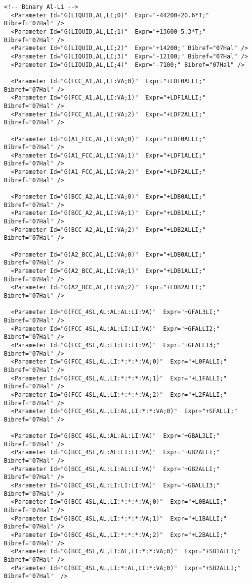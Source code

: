 \documentclass{article}
\begin{document}
\begin{appendices}
\begin{verbatim}
<!-- Binary Al-Li -->
  <Parameter Id="G(LIQUID,AL,LI;0)"  Expr="-44200+20.6*T;" Bibref="07Hal" />
  <Parameter Id="G(LIQUID,AL,LI;1)"  Expr="+13600-5.3*T;" Bibref="07Hal" />
  <Parameter Id="G(LIQUID,AL,LI;2)"  Expr="+14200;" Bibref="07Hal" />
  <Parameter Id="G(LIQUID,AL,LI;3)"  Expr="-12100;" Bibref="07Hal" />
  <Parameter Id="G(LIQUID,AL,LI;4)"  Expr="-7100;" Bibref="07Hal" />

  <Parameter Id="G(FCC_A1,AL,LI:VA;0)"  Expr="+LDF0ALLI;" Bibref="07Hal" />
  <Parameter Id="G(FCC_A1,AL,LI:VA;1)"  Expr="+LDF1ALLI;" Bibref="07Hal" />
  <Parameter Id="G(FCC_A1,AL,LI:VA;2)"  Expr="+LDF2ALLI;" Bibref="07Hal" />

  <Parameter Id="G(A1_FCC,AL,LI:VA;0)"  Expr="+LDF0ALLI;" Bibref="07Hal" />
  <Parameter Id="G(A1_FCC,AL,LI:VA;1)"  Expr="+LDF1ALLI;" Bibref="07Hal" />
  <Parameter Id="G(A1_FCC,AL,LI:VA;2)"  Expr="+LDF2ALLI;" Bibref="07Hal" />

  <Parameter Id="G(BCC_A2,AL,LI:VA;0)"  Expr="+LDB0ALLI;" Bibref="07Hal" />
  <Parameter Id="G(BCC_A2,AL,LI:VA;1)"  Expr="+LDB1ALLI;" Bibref="07Hal" />
  <Parameter Id="G(BCC_A2,AL,LI:VA;2)"  Expr="+LDB2ALLI;" Bibref="07Hal" />

  <Parameter Id="G(A2_BCC,AL,LI:VA;0)"  Expr="+LDB0ALLI;" Bibref="07Hal" />
  <Parameter Id="G(A2_BCC,AL,LI:VA;1)"  Expr="+LDB1ALLI;" Bibref="07Hal" />
  <Parameter Id="G(A2_BCC,AL,LI:VA;2)"  Expr="+LDB2ALLI;" Bibref="07Hal" />

  <Parameter Id="G(FCC_4SL,AL:AL:AL:LI:VA)"  Expr="+GFAL3LI;" Bibref="07Hal" />
  <Parameter Id="G(FCC_4SL,AL:AL:LI:LI:VA)"  Expr="+GFALLI2;" Bibref="07Hal" />
  <Parameter Id="G(FCC_4SL,AL:LI:LI:LI:VA)"  Expr="+GFALLI3;" Bibref="07Hal" />
  <Parameter Id="G(FCC_4SL,AL,LI:*:*:*:VA;0)"  Expr="+L0FALLI;" Bibref="07Hal" />
  <Parameter Id="G(FCC_4SL,AL,LI:*:*:*:VA;1)"  Expr="+L1FALLI;" Bibref="07Hal" />
  <Parameter Id="G(FCC_4SL,AL,LI:*:*:*:VA;2)"  Expr="+L2FALLI;" Bibref="07Hal" />
  <Parameter Id="G(FCC_4SL,AL,LI:AL,LI:*:*:VA;0)"  Expr="+SFALLI;" Bibref="07Hal" />

  <Parameter Id="G(BCC_4SL,AL:AL:AL:LI:VA)"  Expr="+GBAL3LI;" Bibref="07Hal" />
  <Parameter Id="G(BCC_4SL,AL:AL:LI:LI:VA)"  Expr="+GB2ALLI;" Bibref="07Hal" />
  <Parameter Id="G(BCC_4SL,AL:LI:AL:LI:VA)"  Expr="+GB2ALLI;" Bibref="07Hal" />
  <Parameter Id="G(BCC_4SL,AL:LI:LI:LI:VA)"  Expr="+GBALLI3;" Bibref="07Hal" />
  <Parameter Id="G(BCC_4SL,AL,LI:*:*:*:VA;0)"  Expr="+L0BALLI;" Bibref="07Hal" />
  <Parameter Id="G(BCC_4SL,AL,LI:*:*:*:VA;1)"  Expr="+L1BALLI;" Bibref="07Hal" />
  <Parameter Id="G(BCC_4SL,AL,LI:*:*:*:VA;2)"  Expr="+L2BALLI;" Bibref="07Hal" />
  <Parameter Id="G(BCC_4SL,AL,LI:AL,LI:*:*:VA;0)"  Expr="+SB1ALLI;" Bibref="07Hal" />
  <Parameter Id="G(BCC_4SL,AL,LI:*:AL,LI:*:VA;0)"  Expr="+SB2ALLI;" Bibref="07Hal"  />
  

\end{verbatim}
\end{appendices}
\end{document}
